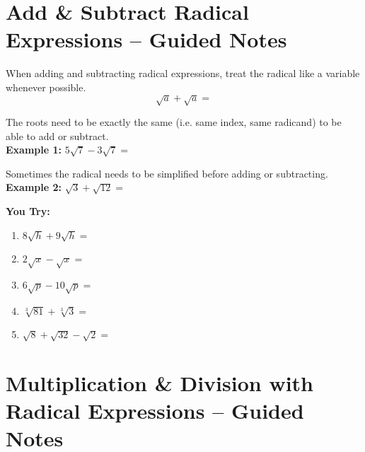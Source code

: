\documentclass[12pt]{article}
\begin{document}
\section{Add \& Subtract Radical Expressions -- Guided Notes}

When adding and subtracting radical expressions, treat the radical like a variable whenever possible.\\

$$\sqrt{a} + \sqrt{a} =$$

The roots need to be exactly the same (i.e. same index, same radicand) to be able to add or subtract.\\

\textbf{Example 1:} $5\sqrt{7} - 3 \sqrt{7} = $\\

\vspace{1cm}

Sometimes the radical needs to be simplified before adding or subtracting.\\

\textbf{Example 2:} $\sqrt{3} + \sqrt{12}=$\\

\vspace{1cm}

\hrulefill

\textbf{You Try:}\\

\begin{enumerate}
\setlength\itemsep{1cm}

	\item $8\sqrt{h}+ 9\sqrt{h}=$\\
	
	\item $2\sqrt{x} - \sqrt{x}=$\\
	
	\item $6\sqrt{p} - 10 \sqrt{p}=$\\
	
	\item $\sqrt[3]{81} + \sqrt[3]{3}=$\\
	
	\item $\sqrt{8} + \sqrt{32} - \sqrt{2}=$\\
	
\end{enumerate}

\section{Multiplication \& Division with Radical Expressions -- Guided Notes}
\end{document}
